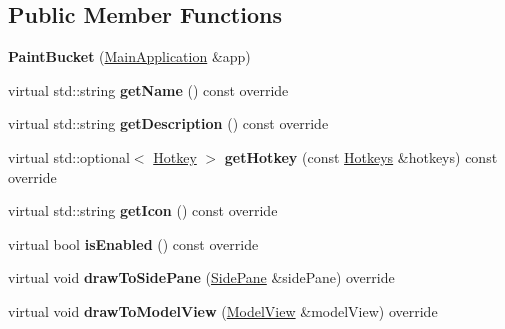 \subsection*{Public Member Functions}
\begin{DoxyCompactItemize}
\item 
\mbox{\label{classpepr3d_1_1_paint_bucket_a48ecf4d542b2ada2c2a9b51669f75bcb}} 
{\bfseries Paint\+Bucket} (\mbox{\hyperlink{classpepr3d_1_1_main_application}{Main\+Application}} \&app)
\item 
\mbox{\label{classpepr3d_1_1_paint_bucket_ab714ccf52a91777feb38d1149bda8451}} 
virtual std\+::string {\bfseries get\+Name} () const override
\item 
\mbox{\label{classpepr3d_1_1_paint_bucket_af756844e2801c8da35fffb900fc2d831}} 
virtual std\+::string {\bfseries get\+Description} () const override
\item 
\mbox{\label{classpepr3d_1_1_paint_bucket_a5707861e941cb4b2337a6b8b8da9c739}} 
virtual std\+::optional$<$ \mbox{\hyperlink{structpepr3d_1_1_hotkey}{Hotkey}} $>$ {\bfseries get\+Hotkey} (const \mbox{\hyperlink{classpepr3d_1_1_hotkeys}{Hotkeys}} \&hotkeys) const override
\item 
\mbox{\label{classpepr3d_1_1_paint_bucket_a81f945468a9ddcca09bd3bd1fa4e156c}} 
virtual std\+::string {\bfseries get\+Icon} () const override
\item 
\mbox{\label{classpepr3d_1_1_paint_bucket_a493abf6741118fc98fefa50adc266a6d}} 
virtual bool {\bfseries is\+Enabled} () const override
\item 
\mbox{\label{classpepr3d_1_1_paint_bucket_a1e4d61353e4c1a2bf4e911690cc45e64}} 
virtual void {\bfseries draw\+To\+Side\+Pane} (\mbox{\hyperlink{classpepr3d_1_1_side_pane}{Side\+Pane}} \&side\+Pane) override
\item 
\mbox{\label{classpepr3d_1_1_paint_bucket_a166b6b6bd0caef117635aec4489cce66}} 
virtual void {\bfseries draw\+To\+Model\+View} (\mbox{\hyperlink{classpepr3d_1_1_model_view}{Model\+View}} \&model\+View) override

\end{DoxyCompactItemize}

